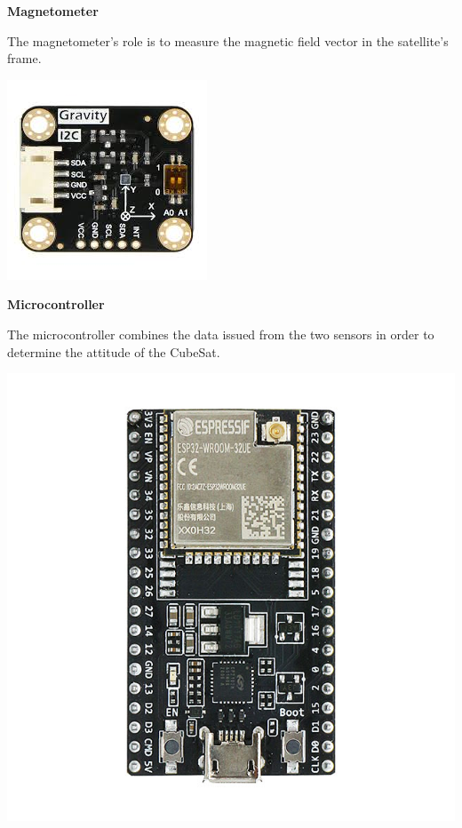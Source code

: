 \documentclass[a4paper, 12pt]{article}
\begin{document}
\begin{minipage}{0.55\textwidth}
\textbf{Magnetometer} 

The magnetometer's role is to measure the magnetic field vector in the satellite's frame.

\end{minipage}
\hfill
\begin{minipage}{0.4\textwidth}
    \centering
    \includegraphics[width=0.5\linewidth]{fig/magnetometer.jpeg}
    \label{fig:Magnetometer}
\end{minipage}


\begin{minipage}{0.55\textwidth}
\textbf{Microcontroller} 

The microcontroller combines the data issued from the two sensors in order to determine the attitude of the CubeSat.

\end{minipage}
\hfill
\begin{minipage}{0.4\textwidth}
    \centering
    \includegraphics[width=0.5\linewidth]{fig/ESP32.jpg}
    \label{fig:Microcontroller}
\end{minipage}
\end{document}
